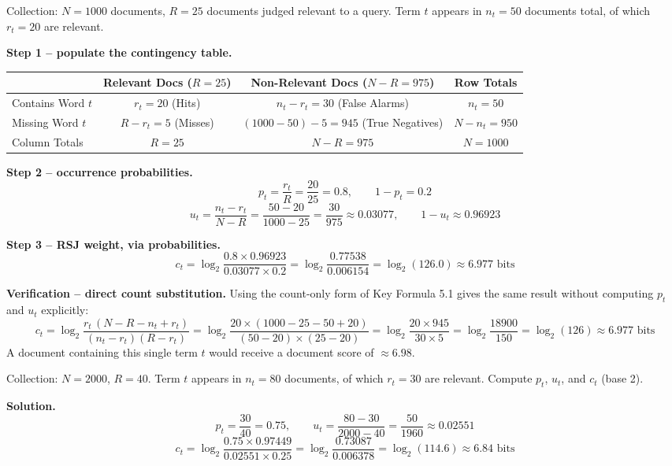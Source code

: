 \documentclass[11pt, a4paper]{article}
\newcommand{\Solution}{\medskip\noindent\textbf{\color{exgreen}Solution.}\ }
\begin{document}
\begin{examplebox}
Collection: $N=1000$ documents, $R=25$ documents judged relevant to a query. Term $t$ appears in $n_t=50$ documents total, of which $r_t=20$ are relevant.

\textbf{Step 1 -- populate the contingency table.}
\begin{center}
\begin{tabular}{@{}lccc@{}}
\toprule
 & Relevant Docs ($R=25$) & Non-Relevant Docs ($N-R=975$) & Row Totals \\
\midrule
Contains Word $t$ & $r_t = 20$ (Hits) & $n_t - r_t = 30$ (False Alarms) & $n_t = 50$ \\
Missing Word $t$  & $R - r_t = 5$ (Misses) & $(1000-50)-5 = 945$ (True Negatives) & $N-n_t = 950$ \\
\midrule
Column Totals & $R=25$ & $N-R=975$ & $N=1000$ \\
\bottomrule
\end{tabular}
\end{center}

\textbf{Step 2 -- occurrence probabilities.}
\[
p_t = \frac{r_t}{R} = \frac{20}{25} = 0.8, \qquad 1-p_t = 0.2
\]
\[
u_t = \frac{n_t-r_t}{N-R} = \frac{50-20}{1000-25} = \frac{30}{975} \approx 0.03077, \qquad 1-u_t \approx 0.96923
\]

\textbf{Step 3 -- RSJ weight, via probabilities.}
\[
c_t = \log_2 \frac{0.8\times0.96923}{0.03077\times0.2} = \log_2\frac{0.77538}{0.006154} = \log_2(126.0) \approx 6.977 \text{ bits}
\]

\textbf{Verification -- direct count substitution.} Using the count-only form of Key Formula 5.1 gives the same result without computing $p_t$ and $u_t$ explicitly:
\[
c_t = \log_2 \frac{r_t\,(N-R-n_t+r_t)}{(n_t-r_t)(R-r_t)} = \log_2\frac{20 \times (1000-25-50+20)}{(50-20)\times(25-20)} = \log_2\frac{20\times945}{30\times5} = \log_2\frac{18900}{150} = \log_2(126) \approx 6.977 \text{ bits}
\]
A document containing this single term $t$ would receive a document score of $\approx6.98$.
\end{examplebox}

\begin{exercisebox}
Collection: $N=2000$, $R=40$. Term $t$ appears in $n_t=80$ documents, of which $r_t=30$ are relevant. Compute $p_t$, $u_t$, and $c_t$ (base 2).
\end{exercisebox}

\Solution
\[
p_t = \frac{30}{40} = 0.75, \qquad u_t = \frac{80-30}{2000-40} = \frac{50}{1960} \approx 0.02551
\]
\[
c_t = \log_2\frac{0.75\times0.97449}{0.02551\times0.25} = \log_2\frac{0.73087}{0.006378} = \log_2(114.6) \approx 6.84 \text{ bits}
\]
\end{document}

